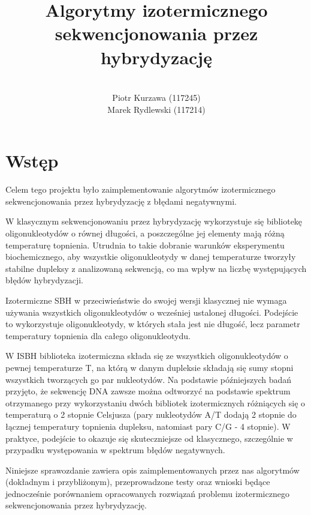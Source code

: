 \documentclass{article}
\title{Algorytmy izotermicznego sekwencjonowania przez hybrydyzację}
\author{ \\ Piotr Kurzawa (117245) \\ Marek Rydlewski (117214)}
\begin{document}
\maketitle

\vspace{3ex}

\tableofcontents

\newpage

\section{Wstęp}

Celem tego projektu było zaimplementowanie algorytmów izotermicznego sekwencjonowania przez hybrydyzację z błędami negatywnymi.

W klasycznym sekwencjonowaniu przez hybrydyzację wykorzystuje się bibliotekę oligonukleotydów o równej długości, a poszczególne jej elementy mają różną temperaturę topnienia. Utrudnia to takie dobranie warunków eksperymentu biochemicznego, aby wszystkie oligonukleotydy w danej temperaturze tworzyły stabilne dupleksy z analizowaną sekwencją, co ma wpływ na liczbę występujących błędów hybrydyzacji.

Izotermiczne SBH w przeciwieństwie do swojej wersji klasycznej nie wymaga używania wszystkich oligonukleotydów o wcześniej ustalonej długości. Podejście to wykorzystuje oligonukleotydy, w których stała jest nie długość, lecz parametr temperatury topnienia dla całego oligonukleotydu. 

W ISBH biblioteka izotermiczna składa się ze wszystkich oligonukleotydów o pewnej temperaturze T, na którą w danym dupleksie składają się sumy stopni wszystkich tworzących go par nukleotydów. Na podstawie późniejszych badań przyjęto, że sekwencję DNA zawsze można odtworzyć na podstawie spektrum otrzymanego przy wykorzystaniu dwóch bibliotek izotermicznych różniących się o temperaturą o 2 stopnie Celsjusza (pary nukleotydów A/T dodają 2 stopnie do łącznej temperatury topnienia dupleksu, natomiast pary C/G - 4 stopnie). W praktyce, podejście to okazuje się skuteczniejsze od klasycznego, szczególnie w przypadku występowania w spektrum błędów negatywnych.

Niniejsze sprawozdanie zawiera opis zaimplementowanych przez nas algorytmów (dokładnym i przybliżonym), przeprowadzone testy oraz wnioski będące jednocześnie porównaniem opracowanych rozwiązań problemu izotermicznego sekwencjonowania przez hybrydyzację.


\end{document}
